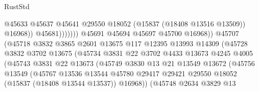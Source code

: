 \begin{lexlean}{RustStd}
\begin{coremodule}
                                                @45633
                                                @45637
                                                @45641
                                                @29550
                                                @18052
                                                (@15837 (@18408 @13516 @13509))
                                                @16968))
                                            @45681)))))))
                              @45691
                              @45694
                              @45697
                              @45700
                              @16968))
                          @45707
                          (@45718
                            @3832
                            @3865
                            @2601
                            @13675
                            @117
                            @12395
                            @13993
                            @14309
                            (@45728
                              @3832
                              @3702
                              @13675
                              (@45734
                                @3831
                                @22
                                @3702
                                @4433
                                @13673
                                @4245
                                @4005
                                (@45743
                                  @3831
                                  @22
                                  @13673
                                  (@45749
                                    @3830
                                    @13
                                    @21
                                    @13549
                                    @13672
                                    (@45756
                                      @13549
                                      (@45767
                                        @13536
                                        @13544
                                        @45780
                                        @29417
                                        @29421
                                        @29550
                                        @18052
                                        (@15837 (@18408 @13544 @13537))
                                        @16968))
                                    (@45748
                                      @2634
                                      @3829
                                      @13

\end{coremodule}
\end{lexlean}
